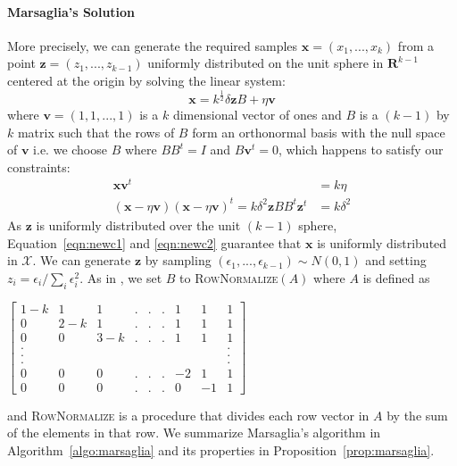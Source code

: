 \paragraph{Marsaglia's Solution}
More precisely, we can generate the required samples $\textbf{x} = (x_1, ..., x_k)$ from a point $\textbf{z} = (z_1, ..., z_{k-1})$ uniformly distributed on the unit sphere in $\mathbf{R}^{k-1}$ centered at the origin by solving the linear system:
\begin{equation}
    \textbf{x} = k^{\frac{1}{2}}\delta\textbf{z}B + \eta \textbf{v}
\label{eqn:linear_system}
\end{equation}
where $\textbf{v} = (1, 1, ..., 1)$ is a $k$ dimensional vector of ones and $B$ is a $(k-1)$ by $k$ matrix such that the rows of $B$ form an orthonormal basis with the null space of $\textbf{v}$ i.e. we choose $B$ where $BB^{t} = I$ and $B\textbf{v}^{t} = 0$, which happens to satisfy our constraints:
\begin{align}
    \textbf{x}\textbf{v}^t &= k\eta \label{eqn:newc1}\\
    (\textbf{x} - \eta\textbf{v})(\textbf{x} - \eta\textbf{v})^t = k\delta^2\textbf{z}BB^t\textbf{z}^t &= k\delta^2 \label{eqn:newc2}
\end{align}
As $\textbf{z}$ is uniformly distributed over the unit $(k-1)$ sphere, Equation~\ref{eqn:newc1} and \ref{eqn:newc2} guarantee that $\textbf{x}$ is uniformly distributed in $\mathcal{X}$. We can generate $\textbf{z}$ by sampling $(\epsilon_1, ..., \epsilon_{k-1}) \sim N(0, 1)$ and setting $z_i = \epsilon_i / \sum_i \epsilon_i^2$. As in \cite{marsaglia1980c69}, we set $B$ to \textsc{RowNormalize}$(A)$ where $A$ is defined as

\begin{center}
$\begin{bmatrix}
1-k & 1 & 1 & . & . & . & 1 & 1& 1\\
0 & 2-k & 1 & . & . & . & 1 &1 & 1\\
0 &  0 & 3-k & . & . & . & 1 & 1 & 1\\
. &  &  &  &  &  &  & & .\\
 .&  &  &  &  &  &  & & .\\
. &  &  &  &  &  &  & &  .\\
0 & 0 & 0  & . & . & . &-2 & 1 & 1\\
0 & 0  & 0 & . & . &. & 0 &  -1 & 1
\end{bmatrix}$
\end{center}

and \textsc{RowNormalize} is a procedure that divides each row vector in $A$ by the sum of the elements in that row. We summarize Marsaglia's algorithm in Algorithm~\ref{algo:marsaglia} and its properties in Proposition~\ref{prop:marsaglia}.

